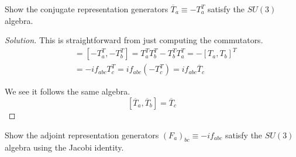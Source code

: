 \documentclass[12pt]{article}
\newenvironment{questionpart}[2][Part]{\begin{trivlist}
\item[\hskip \labelsep \hskip \labelsep {\bfseries (#2)}]}{\end{trivlist}}
\newenvironment{solution}{\begin{proof}[Solution]}{\end{proof}}
\begin{document}
\begin{questionpart}{a}
Show the conjugate representation generators $\overline{T}_a\equiv-T_a^T$ satisfy the $SU(3)$ algebra.
\end{questionpart}

\begin{solution}
This is straightforward from just computing the commutators.
\begin{align*}
    [\overline{T}_a,\overline{T}_b]&=[-T_a^T,-T_b^T]=T_a^TT_b^T-T_b^TT_a^T=-[T_a, T_b]^T\\
    &=-if_{abc}T_c^T=if_{abc}(-T_c^T)=if_{abc}\overline{T}_c
\end{align*}

We see it follows the same algebra.
\begin{equation*}
    \boxed{[\overline{T}_a,\overline{T}_b]=\overline{T}_c }
\end{equation*}

\end{solution}

\begin{questionpart}{b}
Show the adjoint representation generators $(F_a)_{bc}\equiv-if_{abc}$ satisfy the $SU(3)$ algebra using the Jacobi identity.
\end{questionpart}
\end{document}
